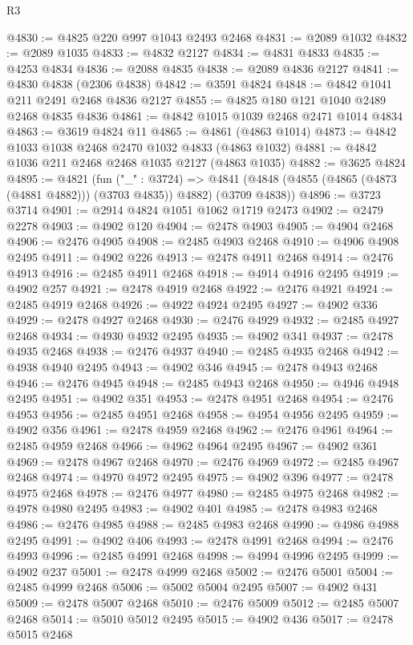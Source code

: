 \begin{lexlean}{R3}
\begin{coremodule}
@4830 := @4825 @220 @997 @1043 @2493 @2468
@4831 := @2089 @1032
@4832 := @2089 @1035
@4833 := @4832 @2127
@4834 := @4831 @4833
@4835 := @4253 @4834
@4836 := @2088 @4835
@4838 := @2089 @4836 @2127
@4841 := @4830 @4838 (@2306 @4838)
@4842 := @3591 @4824
@4848 := @4842 @1041 @211 @2491 @2468 @4836 @2127
@4855 := @4825 @180 @121 @1040 @2489 @2468 @4835 @4836
@4861 := @4842 @1015 @1039 @2468 @2471 @1014 @4834
@4863 := @3619 @4824 @11
@4865 := @4861 (@4863 @1014)
@4873 := @4842 @1033 @1038 @2468 @2470 @1032 @4833 (@4863 @1032)
@4881 := @4842 @1036 @211 @2468 @2468 @1035 @2127 (@4863 @1035)
@4882 := @3625 @4824
@4895 := @4821
    (fun ("_" : @3724) =>
    @4841 (@4848 (@4855 (@4865 (@4873 (@4881 @4882))) (@3703 @4835)) @4882) (@3709 @4838))
@4896 := @3723 @3714
@4901 := @2914 @4824 @1051 @1062 @1719 @2473
@4902 := @2479 @2278
@4903 := @4902 @120
@4904 := @2478 @4903
@4905 := @4904 @2468
@4906 := @2476 @4905
@4908 := @2485 @4903 @2468
@4910 := @4906 @4908 @2495
@4911 := @4902 @226
@4913 := @2478 @4911 @2468
@4914 := @2476 @4913
@4916 := @2485 @4911 @2468
@4918 := @4914 @4916 @2495
@4919 := @4902 @257
@4921 := @2478 @4919 @2468
@4922 := @2476 @4921
@4924 := @2485 @4919 @2468
@4926 := @4922 @4924 @2495
@4927 := @4902 @336
@4929 := @2478 @4927 @2468
@4930 := @2476 @4929
@4932 := @2485 @4927 @2468
@4934 := @4930 @4932 @2495
@4935 := @4902 @341
@4937 := @2478 @4935 @2468
@4938 := @2476 @4937
@4940 := @2485 @4935 @2468
@4942 := @4938 @4940 @2495
@4943 := @4902 @346
@4945 := @2478 @4943 @2468
@4946 := @2476 @4945
@4948 := @2485 @4943 @2468
@4950 := @4946 @4948 @2495
@4951 := @4902 @351
@4953 := @2478 @4951 @2468
@4954 := @2476 @4953
@4956 := @2485 @4951 @2468
@4958 := @4954 @4956 @2495
@4959 := @4902 @356
@4961 := @2478 @4959 @2468
@4962 := @2476 @4961
@4964 := @2485 @4959 @2468
@4966 := @4962 @4964 @2495
@4967 := @4902 @361
@4969 := @2478 @4967 @2468
@4970 := @2476 @4969
@4972 := @2485 @4967 @2468
@4974 := @4970 @4972 @2495
@4975 := @4902 @396
@4977 := @2478 @4975 @2468
@4978 := @2476 @4977
@4980 := @2485 @4975 @2468
@4982 := @4978 @4980 @2495
@4983 := @4902 @401
@4985 := @2478 @4983 @2468
@4986 := @2476 @4985
@4988 := @2485 @4983 @2468
@4990 := @4986 @4988 @2495
@4991 := @4902 @406
@4993 := @2478 @4991 @2468
@4994 := @2476 @4993
@4996 := @2485 @4991 @2468
@4998 := @4994 @4996 @2495
@4999 := @4902 @237
@5001 := @2478 @4999 @2468
@5002 := @2476 @5001
@5004 := @2485 @4999 @2468
@5006 := @5002 @5004 @2495
@5007 := @4902 @431
@5009 := @2478 @5007 @2468
@5010 := @2476 @5009
@5012 := @2485 @5007 @2468
@5014 := @5010 @5012 @2495
@5015 := @4902 @436
@5017 := @2478 @5015 @2468

\end{coremodule}
\end{lexlean}
